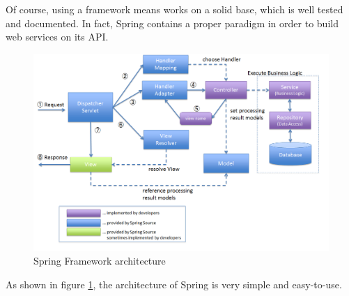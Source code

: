 \documentclass[table, 12pt]{article}
\begin{document}
Of course, using a framework means works on a solid base, which is well tested and documented. In fact, Spring contains a proper paradigm in order to build web services on its API.

\begin{figure}
    \includegraphics[width=\textwidth]{assets/SpringArchitecture.png}
    \caption{Spring Framework architecture}
    \label{spring_architecture}
\end{figure}

As shown in figure \ref{spring_architecture}, the architecture of Spring is very simple and easy-to-use.
\end{document}
